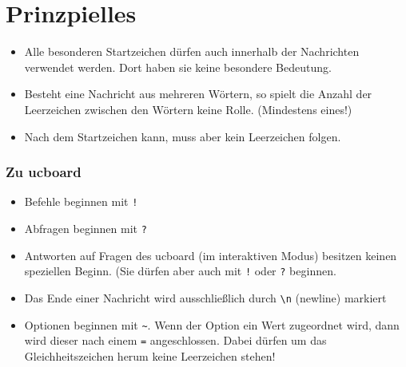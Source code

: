 \section{Prinzpielles}

\begin{itemize}
	\item Alle besonderen Startzeichen dürfen auch innerhalb der Nachrichten verwendet werden. Dort haben sie keine besondere Bedeutung.
	\item Besteht eine Nachricht aus mehreren Wörtern, so spielt die Anzahl der Leerzeichen zwischen den Wörtern keine Rolle. (Mindestens eines!)
	\item Nach dem Startzeichen kann, muss aber kein Leerzeichen folgen.
\end{itemize}


\subsubsection{Zu ucboard}
\begin{itemize}
	\item Befehle beginnen mit \texttt{!}
	\item Abfragen beginnen mit \texttt{?}
	\item Antworten auf Fragen des ucboard (im interaktiven Modus) besitzen keinen speziellen Beginn. (Sie dürfen aber auch mit \texttt{!} oder \texttt{?} beginnen.
	\item Das Ende einer Nachricht wird ausschließlich durch \texttt{\textbackslash n} (newline) markiert
	\item Optionen beginnen mit \verb+~+. Wenn der Option ein Wert zugeordnet wird, dann wird dieser nach einem \texttt{=} angeschlossen. Dabei dürfen um das Gleichheitszeichen herum keine Leerzeichen stehen!
\end{itemize}


